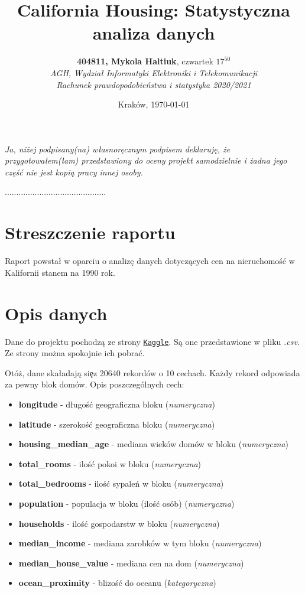 \documentclass{article}
\title{California Housing: Statystyczna analiza danych}
\author{\textbf{404811, Mykola Haltiuk}, czwartek $17^{50}$\\ 
\textit{AGH, Wydział Informatyki Elektroniki i Telekomunikacji}\\
\textit{Rachunek prawdopodobieństwa i statystyka 2020/2021}}
\date{Kraków, \today}
\begin{document}

\maketitle

\textit{Ja, niżej podpisany(na) własnoręcznym podpisem deklaruję, że przygotowałem(łam) przedstawiony do oceny projekt samodzielnie i żadna jego część nie jest kopią pracy innej osoby.}
\begin{flushright}
{............................................}
\end{flushright}

\section{Streszczenie raportu}
Raport powstał w oparciu o analizę danych dotyczących cen na nieruchomoś\'c w
Kalifornii stanem na 1990 rok.

\section{Opis danych}
Dane do projektu pochodzą ze strony \href{https://www.kaggle.com/camnugent/california-housing-prices}{\texttt{Kaggle}}. Są one przedstawione w pliku \textit{.csv}. Ze strony można
spokojnie ich pobra\'c.

\noindent
\quad Otóż, dane ska\l adają si\c ez 20640 rekordów o 10 cechach. Każdy rekord
odpowiada za pewny blok domów. Opis poszczególnych cech:

\begin{itemize}
  \item \textbf{longitude} - d\l ugoś\'c geograficzna bloku (\textit{numeryczna})
  \item \textbf{latitude} - szerokoś\'c geograficzna bloku (\textit{numeryczna})
  \item \textbf{housing\_median\_age} - mediana wieków domów w bloku (\textit{numeryczna})
  \item \textbf{total\_rooms} - iloś\'c pokoi w bloku (\textit{numeryczna})
  \item \textbf{total\_bedrooms} - iloś\'c sypaleń w bloku (\textit{numeryczna})
  \item \textbf{population} - populacja w bloku (iloś\'c osób) (\textit{numeryczna})
  \item \textbf{households} - iloś\'c gospodarstw w bloku (\textit{numeryczna})
  \item \textbf{median\_income} - mediana zarobków w tym bloku (\textit{numeryczna})
  \item \textbf{median\_house\_value} - mediana cen na dom (\textit{numeryczna})
  \item \textbf{ocean\_proximity} - blizoś\'c do oceanu (\textit{kategoryczna})
\end{itemize}
\end{document}
